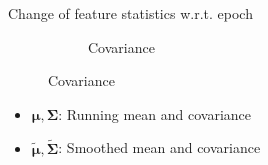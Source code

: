 \begin{frame}{Change of feature statistics w.r.t. epoch}
\begin{figure}[h]
\begin{subfigure}{0.48\textwidth}
			\caption{Covariance}
		\end{subfigure}
	\end{figure}
	\begin{itemize}
		\item ${\bm{\mu}, \bm{\Sigma}}$: Running mean and covariance
		\item ${\tilde{\bm{\mu}}, \tilde{\bm{\Sigma}}}$: Smoothed mean and covariance
	\end{itemize}
\end{frame}

